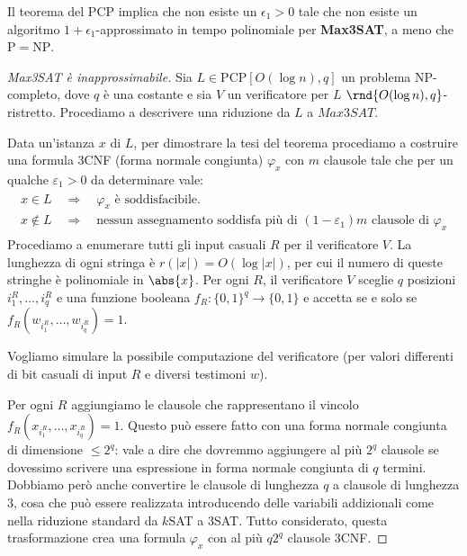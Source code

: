 \documentclass[\main/main.tex]{subfiles}
\begin{document}
\clearpage
\begin{theorem}
    Il teorema del PCP implica che non esiste un \(\epsilon_1 > 0\) tale che non esiste un algoritmo \(1+\epsilon_1\)-approssimato in tempo polinomiale per \textbf{Max3SAT}, a meno che \(\mathrm{P}=\mathrm{NP}\).
\end{theorem}
\begin{proof}[Max3SAT è inapprossimabile]
    Sia \(L \in \mathrm{PCP}[O(\log n), q]\) un problema \(\mathrm{NP}\)-completo, dove \(q\) è una costante e sia \(V\) un verificatore per \(L\) \(\rnd{O(\log n), q}\)-ristretto. Procediamo a descrivere una riduzione da \(L\) a \(Max3SAT\).
    
    Data un'istanza \(x\) di \(L\), per dimostrare la tesi del teorema procediamo a costruire una formula 3CNF (forma normale congiunta) \(\varphi_x\) con \(m\) clausole tale che per un qualche \(\varepsilon_1 > 0\) da determinare vale:
    \begin{align*}
        \begin{array}{l}
            {x \in L \quad \Rightarrow \quad \varphi_{x} \text { è soddisfacibile.}} \\
            {x \notin L \quad \Rightarrow \quad \text {nessun assegnamento soddisfa più di }\left(1-\varepsilon_{1}\right) m \text { clausole di } \varphi_{x}}
        \end{array}
    \end{align*}
    Procediamo a enumerare tutti gli input casuali \(R\) per il verificatore \(V\). La lunghezza di ogni stringa è \(r(|x|)=O(\log |x|)\), per cui il numero di queste stringhe è polinomiale in \(\abs{x}\). Per ogni \(R\), il verificatore \(V\) sceglie \(q\) posizioni \(i_{1}^{R}, \ldots, i_{q}^{R}\) e una funzione booleana \(f_{R} :\{0,1\}^{q} \rightarrow\{0,1\}\) e accetta se e solo se \(f_{R}\left(w_{i_{1}^{R}}, \ldots, w_{i_{q}^{R}}\right)=1\).
    
    Vogliamo simulare la possibile computazione del verificatore (per valori differenti di bit casuali di input \(R\) e diversi testimoni \(w\)).
    
    Per ogni \(R\) aggiungiamo le clausole che rappresentano il vincolo \(f_{R}\left(x_{i_{1}^{R}}, \ldots, x_{i_{q}^{R}}\right)=1\). Questo può essere fatto con una forma normale congiunta di dimensione \(\leq 2^q\): vale a dire che dovremmo aggiungere al più \(2^q\) clausole se dovessimo scrivere una espressione in forma normale congiunta di \(q\) termini. Dobbiamo però anche convertire le clausole di lunghezza \(q\) a clausole di lunghezza \(3\), cosa che può essere realizzata introducendo delle variabili addizionali come nella riduzione standard da \(k\)SAT a \(3\)SAT. Tutto considerato, questa trasformazione crea una formula \(\varphi_x\) con al più \(q 2^{q}\) clausole \(3\)CNF.
    

\end{proof}
\end{document}
